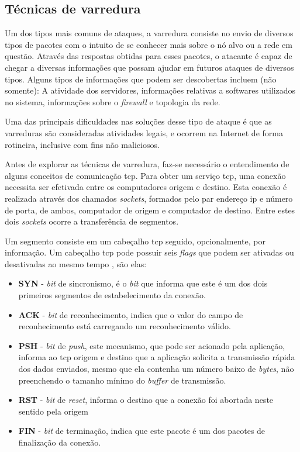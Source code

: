 \subsection{Técnicas de varredura}
\label{sec:varredura}

Um dos tipos mais comuns de ataques, a varredura consiste no envio de diversos tipos de pacotes com o intuito de se conhecer mais sobre o nó alvo ou a rede em questão. Através das respostas obtidas para esses pacotes, o atacante é capaz de chegar a diversas informações que possam ajudar em futuros ataques de diversos tipos. Alguns tipos de informações que podem ser descobertas incluem (não somente): A atividade dos servidores, informações relativas a softwares utilizados no sistema, informações sobre o \textit{firewall} e topologia da rede.

Uma das principais dificuldades nas soluções desse tipo de ataque é que as varreduras são consideradas atividades legais, e ocorrem na Internet de forma rotineira, inclusive com fins não maliciosos.

Antes de explorar as técnicas de varredura, faz-se necessário o entendimento de alguns conceitos de comunicação \gls{tcp}. Para obter um serviço \gls{tcp}, uma conexão necessita ser efetivada entre os computadores origem e destino. Esta conexão é realizada através dos chamados \textit{sockets}, formados pelo par endereço \gls{ip} e número de porta, de ambos, computador de origem e computador de destino. Entre estes dois \textit{sockets} ocorre a transferência de segmentos.

Um segmento consiste em um cabeçalho \gls{tcp} seguido, opcionalmente, por informação. Um cabeçalho \gls{tcp} pode possuir seis \textit{flags} que podem ser ativadas ou desativadas ao mesmo tempo \cite{Comer:2013}, são elas:

\begin{itemize}
    \item \textbf{SYN} - \textit{bit} de sincronismo, é o \textit{bit} que informa que este é um dos dois primeiros segmentos de estabelecimento da conexão.
    \item \textbf{ACK} - \textit{bit} de reconhecimento, indica que o valor do campo de reconhecimento está carregando um reconhecimento válido.
    \item \textbf{PSH} - \textit{bit} de \textit{push}, este mecanismo, que pode ser acionado pela aplicação, informa ao \gls{tcp} origem e destino que a aplicação solicita a transmissão rápida dos dados enviados, mesmo que ela contenha um número baixo de \textit{bytes}, não preenchendo o tamanho mínimo do \textit{buffer} de transmissão.
    \item \textbf{RST} - \textit{bit} de \textit{reset}, informa o destino que a conexão foi abortada neste sentido pela origem
    \item \textbf{FIN} - \textit{bit} de terminação, indica que este pacote é um dos pacotes de finalização da conexão.
\end{itemize}

